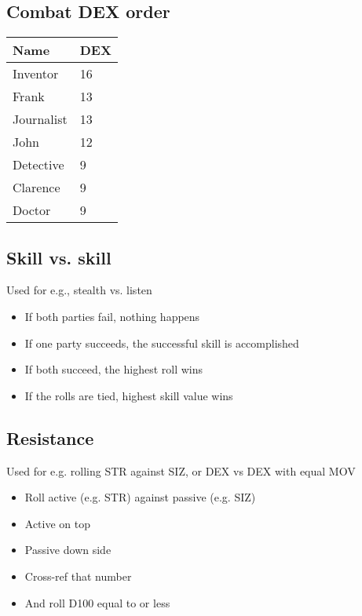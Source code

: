\documentclass[12pt,a4paper]{article}
\begin{document}
\subsection*{Combat DEX order}
\begin{tabular}{| l | l |}
\hline
Name & DEX \\
\hline
Inventor & 16 \\
Frank & 13 \\
Journalist & 13\\
John & 12 \\
Detective & 9 \\
Clarence & 9 \\
Doctor & 9 \\
\hline
\end{tabular}
\newpage
\subsection*{Skill vs. skill}
Used for e.g., stealth vs. listen
\begin{itemize}
\item{If both parties fail, nothing happens}
\item{If one party succeeds, the successful skill is accomplished}
\item{If both succeed, the highest roll wins}
\item{If the rolls are tied, highest skill value wins}
\end{itemize}
\subsection*{Resistance}
Used for e.g. rolling STR against SIZ, or DEX vs DEX with equal MOV
\begin{itemize}
\item{Roll active (e.g. STR) against passive (e.g. SIZ)}
\item{Active on top}
\item{Passive down side}
\item{Cross-ref that number}
\item{And roll D100 equal to or less}
\end{itemize}
\end{document}
